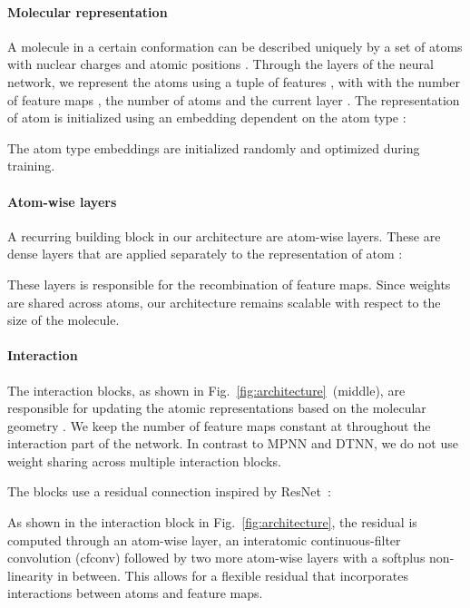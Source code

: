 \documentclass{article}
\begin{document}
\paragraph{Molecular representation}
A molecule in a certain conformation can be described uniquely by a set of  atoms with nuclear charges  and atomic positions .
Through the layers of the neural network, we represent the atoms using a tuple of features , with  with the number of feature maps , the number of atoms  and the current layer .
The representation of atom   is initialized using an embedding dependent on the atom type :

The atom type embeddings  are initialized randomly and optimized during training. 

\paragraph{Atom-wise layers}
A recurring building block in our architecture are atom-wise layers.
These are dense layers that are applied separately to the representation  of atom :

These layers is responsible for the recombination of feature maps.
Since weights are shared across atoms, our architecture remains scalable with respect to the size of the molecule.

\paragraph{Interaction}
The interaction blocks, as shown in Fig.~\ref{fig:architecture}~(middle), are responsible for updating the atomic representations based on the molecular geometry . 
We keep the number of feature maps constant at  throughout the interaction part of the network.
In contrast to MPNN and DTNN, we do not use weight sharing across multiple interaction blocks.

The blocks use a residual connection inspired by ResNet~\citep{he2016deep}:

As shown in the interaction block in Fig.~\ref{fig:architecture}, the residual  is computed through an atom-wise layer, an interatomic continuous-filter convolution (cfconv) followed by two more atom-wise layers with a softplus non-linearity in between.
This allows for a flexible residual that incorporates interactions between atoms and feature maps.
\end{document}
